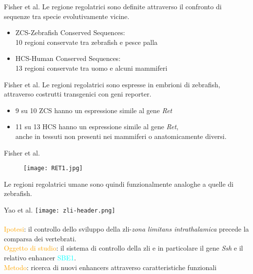 \documentclass{beamer}
\newcommand{\hh}[1]{\textcolor{orange}{#1}}
\begin{document}
    \begin{frame}[plain]{Fisher et al.  }
        Le regione regolatrici sono definite attraverso il confronto di sequenze
        tra specie evolutivamente vicine.
        \begin{itemize}
            \item ZCS-Zebrafish Conserved Sequences:\\
            10 regioni conservate tra zebrafish e pesce palla
            \item HCS-Human Conserved Sequences:\\
            13 regioni conservate tra uomo e alcuni mammiferi
        \end{itemize}
    \end{frame}


    \begin{frame}[plain]{Fisher et al.  }
        Le regioni regolatrici sono espresse in embrioni di zebrafish,
        attraverso costrutti transgenici con geni reporter.
        \begin{itemize}
            \item 9 su 10 ZCS hanno un espressione simile al gene \emph{Ret}
            \item 11 su 13 HCS hanno un espressione simile al gene \emph{Ret},\\
            anche in tessuti non presenti nei mammiferi o anatomicamente diversi.
        \end{itemize}
    \end{frame}


    \begin{frame}[plain]{Fisher et al.  }
        \begin{figure}
            \texttt{[image: RET1.jpg]}
        \end{figure}
        Le regioni regolatrici umane sono quindi funzionalmente analoghe a quelle di zebrafish.
    \end{frame}


    \begin{frame}[plain]{Yao et al.  }
        \texttt{[image: zli-header.png]}\\~\\
        \hh{Ipotesi}: il controllo dello sviluppo della zli-\emph{zona limitans intrathalamica}
        precede la comparsa dei vertebrati.\\
        \hh{Oggetto di studio}: il sistema di controllo della zli e in particolare il gene \emph{Ssh}
        e il relativo enhancer \textcolor{cyan}{SBE1}.\\
        \hh{Metodo}: ricerca di nuovi enhancers attraverso caratteristiche funzionali
    \end{frame}
\end{document}
